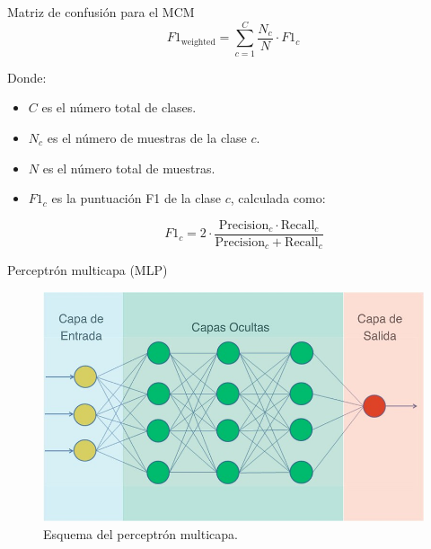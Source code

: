 \begin{frame}{Matriz de confusión para el MCM}
\scriptsize
\begin{equation*}
F1_{\text{weighted}} = \sum_{c=1}^{C} \frac{N_c}{N} \cdot F1_c
\end{equation*}

Donde:
\begin{itemize}
    \item \( C \) es el número total de clases.
    \item \( N_c \) es el número de muestras de la clase \( c \).
    \item \( N \) es el número total de muestras.
    \item \( F1_c \) es la puntuación F1 de la clase \( c \), calculada como:
    

\[
    F1_c = 2 \cdot \frac{\text{Precision}_c \cdot \text{Recall}_c}{\text{Precision}_c + \text{Recall}_c}
    \]


\end{itemize}



\end{frame}


\begin{frame}{Perceptrón multicapa (MLP)}
	\begin{figure}
		\centering
	    \includegraphics[width=\linewidth]{../Memoria/img/modelo/capas.png}
    		\caption{Esquema del perceptrón multicapa.}
	\end{figure}
\end{frame}




